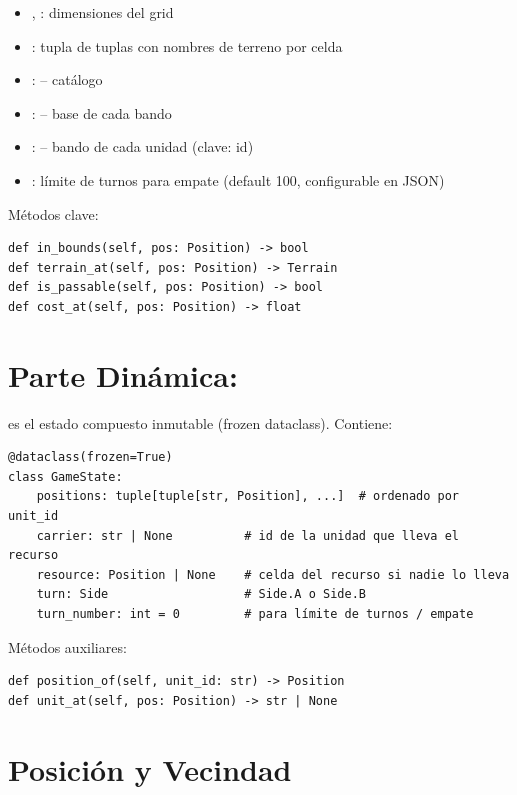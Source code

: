 \begin{itemize}
\item {}, : dimensiones del grid
\item {}: tupla de tuplas con nombres de terreno por celda
\item {}:  -- catálogo 
\item {}:  -- base de cada bando
\item {}:  -- bando de cada unidad (clave: id)
\item {}: límite de turnos para empate (default 100, configurable en JSON)
\end{itemize}

Métodos clave:
\begin{verbatim}
def in_bounds(self, pos: Position) -> bool
def terrain_at(self, pos: Position) -> Terrain
def is_passable(self, pos: Position) -> bool
def cost_at(self, pos: Position) -> float
\end{verbatim}

\section{Parte Dinámica: }
\label{sec:gamestate}

 es el estado compuesto inmutable (frozen dataclass). Contiene:

\begin{verbatim}
@dataclass(frozen=True)
class GameState:
    positions: tuple[tuple[str, Position], ...]  # ordenado por unit_id
    carrier: str | None          # id de la unidad que lleva el recurso
    resource: Position | None    # celda del recurso si nadie lo lleva
    turn: Side                   # Side.A o Side.B
    turn_number: int = 0         # para límite de turnos / empate
\end{verbatim}

Métodos auxiliares:
\begin{verbatim}
def position_of(self, unit_id: str) -> Position
def unit_at(self, pos: Position) -> str | None
\end{verbatim}

\section{Posición y Vecindad}
\label{sec:position}

